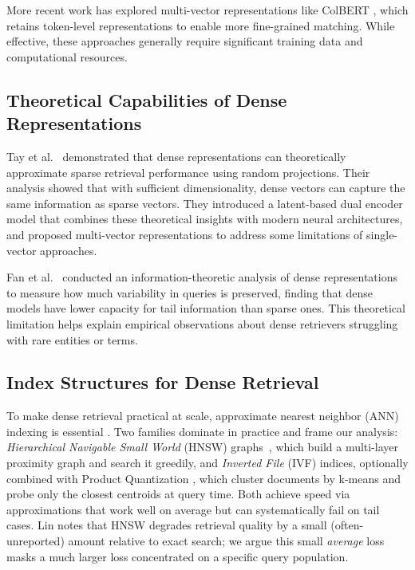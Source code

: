 \documentclass[conference]{IEEEtran}
\begin{document}
More recent work has explored multi-vector representations like ColBERT \cite{khattab2020colbert}, which retains token-level representations to enable more fine-grained matching. While effective, these approaches generally require significant training data and computational resources.

\subsection{Theoretical Capabilities of Dense Representations}
Tay et al.\ \cite{tay2020sparse} demonstrated that dense representations can theoretically approximate sparse retrieval performance using random projections. Their analysis showed that with sufficient dimensionality, dense vectors can capture the same information as sparse vectors. They introduced a latent-based dual encoder model that combines these theoretical insights with modern neural architectures, and proposed multi-vector representations to address some limitations of single-vector approaches.

Fan et al.\ \cite{fan2022information} conducted an information-theoretic analysis of dense representations to measure how much variability in queries is preserved, finding that dense models have lower capacity for tail information than sparse ones. This theoretical limitation helps explain empirical observations about dense retrievers struggling with rare entities or terms.

\subsection{Index Structures for Dense Retrieval}
To make dense retrieval practical at scale, approximate nearest neighbor (ANN) indexing is essential \cite{johnson2019billion}. Two families dominate in practice and frame our analysis: \emph{Hierarchical Navigable Small World} (HNSW) graphs~\cite{malkov2019efficient}, which build a multi-layer proximity graph and search it greedily, and \emph{Inverted File} (IVF) indices, optionally combined with Product Quantization \cite{jegou2010product}, which cluster documents by k-means and probe only the closest centroids at query time. Both achieve speed via approximations that work well on average but can systematically fail on tail cases. Lin \cite{lin2024dense} notes that HNSW degrades retrieval quality by a small (often-unreported) amount relative to exact search; we argue this small \emph{average} loss masks a much larger loss concentrated on a specific query population.
\end{document}
